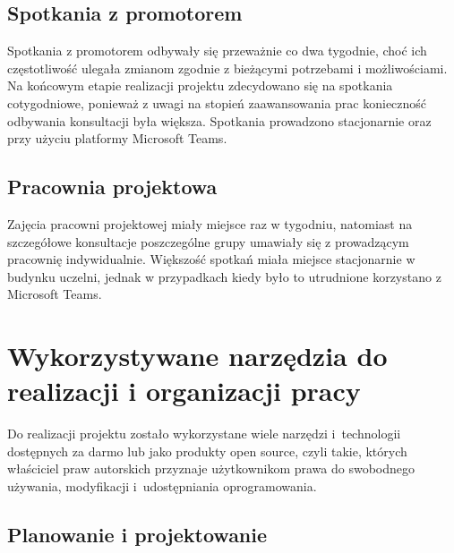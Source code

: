 
\subsection{Spotkania z promotorem}
Spotkania z promotorem odbywały się przeważnie co dwa tygodnie, choć ich częstotliwość 
ulegała zmianom zgodnie z bieżącymi potrzebami i możliwościami. Na końcowym etapie realizacji projektu zdecydowano 
się na spotkania cotygodniowe, ponieważ z uwagi na stopień zaawansowania prac konieczność odbywania 
konsultacji była większa. Spotkania prowadzono stacjonarnie oraz przy użyciu platformy Microsoft Teams.

\subsection{Pracownia projektowa}
Zajęcia pracowni projektowej miały miejsce raz w tygodniu, natomiast na szczegółowe konsultacje 
poszczególne grupy umawiały się z prowadzącym pracownię indywidualnie. Większość spotkań miała 
miejsce stacjonarnie w budynku uczelni, jednak w przypadkach kiedy było to utrudnione korzystano 
z Microsoft Teams. 



\section{Wykorzystywane narzędzia do realizacji i organizacji pracy}

Do realizacji projektu zostało wykorzystane wiele narzędzi i~technologii
dostępnych za darmo lub jako produkty open source, czyli takie,
których właściciel praw autorskich przyznaje użytkownikom prawa
do swobodnego używania, modyfikacji i~udostępniania oprogramowania.


\subsection{Planowanie i projektowanie}

